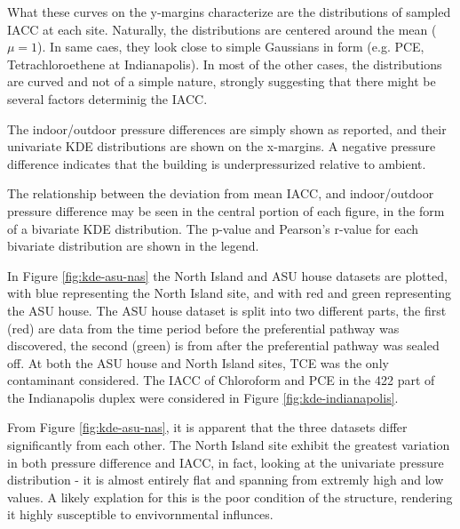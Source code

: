 \documentclass[journal=esthag,manuscript=article]{achemso}
\begin{document}
What these curves on the y-margins characterize are the distributions of sampled IACC at each site.
Naturally, the distributions are centered around the mean ($\mu = 1$).
In same caes, they look close to simple Gaussians in form (e.g. PCE, Tetrachloroethene at Indianapolis).
In most of the other cases, the distributions are curved and not of a simple nature, strongly suggesting that there might be several factors determinig the IACC. \par

The indoor/outdoor pressure differences are simply shown as reported, and their univariate KDE distributions are shown on the x-margins.
A negative pressure difference indicates that the building is underpressurized relative to ambient.\par
The relationship between the deviation from mean IACC, and indoor/outdoor pressure difference may be seen in the central portion of each figure, in the form of a bivariate KDE distribution.
The p-value and Pearson's r-value for each bivariate distribution are shown in the legend.\par
In Figure \ref{fig:kde-asu-nas} the North Island and ASU house datasets are plotted, with blue representing the North Island site, and with red and green representing the ASU house.
The ASU house dataset is split into two different parts, the first (red) are data from the time period before the preferential pathway was discovered, the second (green) is from after the preferential pathway was sealed off.
At both the ASU house and North Island sites, TCE was the only contaminant considered.
The IACC of Chloroform and PCE in the 422 part of the Indianapolis duplex were considered in Figure \ref{fig:kde-indianapolis}.\par
From Figure \ref{fig:kde-asu-nas}, it is apparent that the three datasets differ significantly from each other.
The North Island site exhibit the greatest variation in both pressure difference and IACC, in fact, looking at the univariate pressure distribution - it is almost entirely flat and spanning from extremly high and low values.
A likely explation for this is the poor condition of the structure, rendering it highly susceptible to envivornmental influnces.\par
\end{document}
